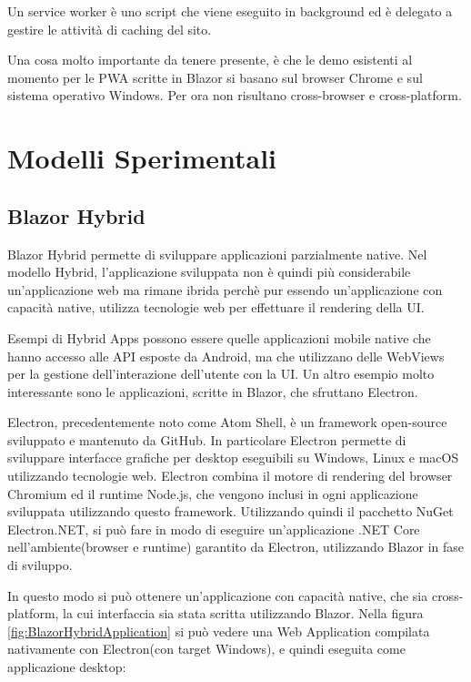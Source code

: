 Un service worker è uno script che viene eseguito in background ed è delegato a gestire le attività di caching del sito.

Una cosa molto importante da tenere presente, \`e che le demo esistenti al momento per le PWA scritte in Blazor si basano sul browser Chrome e sul sistema operativo Windows.
Per ora non risultano cross-browser e cross-platform.

\pagebreak

\section{Modelli Sperimentali}
\subsection{Blazor Hybrid}\label{sez:bhybrid}
Blazor Hybrid permette di sviluppare applicazioni parzialmente native.
Nel modello Hybrid, l'applicazione sviluppata non \`e quindi pi\`u considerabile un'applicazione web ma rimane ibrida perch\`e pur essendo un'applicazione con capacit\`a native, utilizza tecnologie web per effettuare il rendering della UI.

Esempi di Hybrid Apps possono essere quelle applicazioni mobile native che hanno accesso alle API esposte da Android, ma che utilizzano delle WebViews per la gestione dell'interazione dell'utente con la UI.
Un altro esempio molto interessante sono le applicazioni, scritte in Blazor, che sfruttano Electron.

Electron, precedentemente noto come Atom Shell, \`e un framework open-source sviluppato e mantenuto da GitHub.
In particolare Electron permette di sviluppare interfacce grafiche per desktop eseguibili su Windows, Linux e macOS utilizzando tecnologie web\cite{electronWiki}.
Electron combina il motore di rendering del browser Chromium ed il runtime Node.js, che vengono inclusi in ogni applicazione sviluppata utilizzando questo framework.
Utilizzando quindi il pacchetto NuGet Electron.NET, si pu\`o fare in modo di eseguire un'applicazione .NET Core nell'ambiente(browser e runtime) garantito da Electron, utilizzando Blazor in fase di sviluppo\cite{electronDotNet}.

In questo modo si pu\`o ottenere un'applicazione con capacit\`a native, che sia cross-platform, la cui interfaccia sia stata scritta utilizzando Blazor.
Nella figura \ref{fig:BlazorHybridApplication} si pu\`o vedere una Web Application compilata nativamente con Electron(con target Windows), e quindi eseguita come applicazione desktop:

